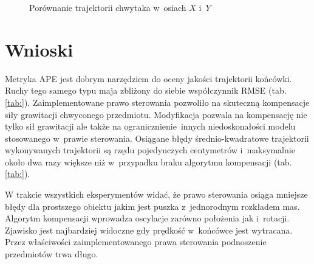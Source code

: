 \begin{figure}[H]
	\centering
	\hfill
	\caption{Porównanie trajektorii chwytaka w~osiach $X$ i~$Y$}
	\label{fig:obrt_porow_przedm_bok}
\end{figure}


\section{Wnioski}

Metryka APE jest dobrym narzędziem do oceny jakości trajektorii końcówki. Ruchy tego samego typu maja zbliżony do siebie współczynnik RMSE (tab. \ref{tab:}). 
Zaimplementowane prawo sterowania pozwoliło na skuteczną kompensacje siły grawitacji chwyconego przedmiotu. Modyfikacja pozwala na kompensację nie tylko sił grawitacji ale także na ogranicznienie innych niedoskonałości modelu stosowanego w~prawie sterowania. Osiągane błędy średnio-kwadratowe trajektorii wykonywanych trajektorii są rzędu pojedynczych centymetrów i~maksymalnie około dwa razy większe niż w~przypadku braku algorytmu kompensacji (tab. \ref{tab:}). 

W trakcie wszystkich eksperymentów widać, że prawo sterowania osiąga mniejsze błędy dla prostszego obiektu jakim jest puszka z~jednorodnym rozkładem mas. Algorytm kompensacji wprowadza oscylacje zarówno położenia jak i~rotacji. Zjawisko jest najbardziej widoczne gdy prędkość w~końcówce jest wytracana. Przez właściwości zaimplementowanego prawa sterowania podnoszenie przedmiotów trwa długo. 


